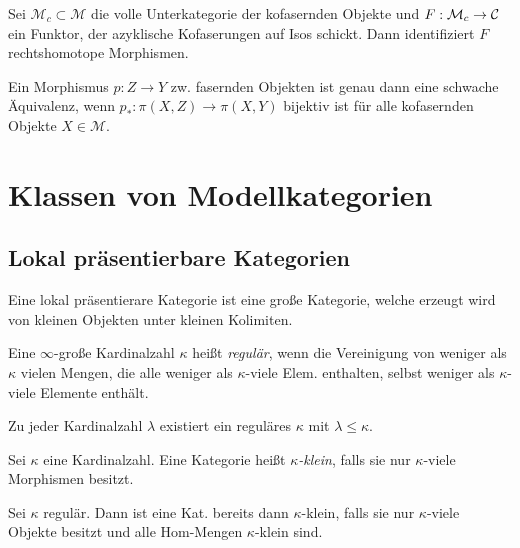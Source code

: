 \documentclass{cheat-sheet}
\newcommand{\ModC}{\mathcal{M}} %
\begin{document}
\begin{lem}
  Sei $\ModC_c \subset \ModC$ die volle Unterkategorie der kofasernden Objekte und $F : \ModC_c \to \Cat$ ein Funktor, der azyklische Kofaserungen auf Isos schickt. Dann identifiziert $F$ rechtshomotope Morphismen.
\end{lem}

\begin{thm}
  Ein Morphismus $p : Z \to Y$ zw. fasernden Objekten ist genau dann eine schwache Äquivalenz, wenn $p_* : \pi(X, Z) \to \pi(X, Y)$ bijektiv ist für alle kofasernden Objekte $X \in \ModC$.
\end{thm}

\section{Klassen von Modellkategorien}

\subsection{Lokal präsentierbare Kategorien}


\begin{motto}
  Eine lokal präsentierare Kategorie ist eine große Kategorie, welche erzeugt wird von kleinen Objekten unter kleinen Kolimiten.
\end{motto}

\begin{defn}
  Eine $\infty$-große Kardinalzahl $\kappa$ heißt \emph{regulär}, wenn die Vereinigung von weniger als $\kappa$ vielen Mengen, die alle weniger als $\kappa$-viele Elem. enthalten, selbst weniger als $\kappa$-viele Elemente enthält.
\end{defn}

\begin{bem}
  Zu jeder Kardinalzahl $\lambda$ existiert ein reguläres $\kappa$ mit $\lambda \leq \kappa$.
\end{bem}

\begin{defn}
  Sei $\kappa$ eine Kardinalzahl. Eine Kategorie heißt \emph{$\kappa$-klein}, falls sie nur $\kappa$-viele Morphismen besitzt.
\end{defn}

\begin{bem}
  Sei $\kappa$ regulär. Dann ist eine Kat. bereits dann $\kappa$-klein, falls sie nur $\kappa$-viele Objekte besitzt und alle Hom-Mengen $\kappa$-klein sind.
\end{bem}
\end{document}
